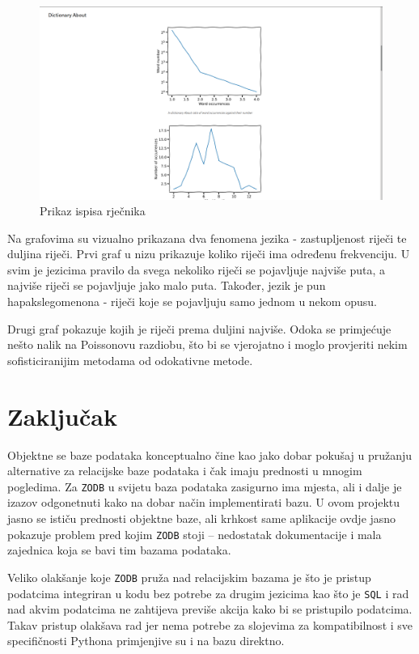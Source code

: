 \documentclass{foi}
\begin{document}
\begin{figure}[!h]
	\includegraphics[width=\textwidth]{slike/solid-spork-stats.png}
	\caption{Prikaz ispisa rječnika}
	\label{ht_stats}
\end{figure}

Na grafovima su vizualno prikazana dva fenomena jezika - zastupljenost riječi
te duljina riječi. Prvi graf u nizu prikazuje koliko riječi ima određenu
frekvenciju. U svim je jezicima pravilo da svega nekoliko riječi se pojavljuje
najviše puta, a najviše riječi se pojavljuje jako malo puta. Također, jezik je
pun hapakslegomenona - riječi koje se pojavljuju samo jednom u nekom opusu.

Drugi graf pokazuje kojih je riječi prema duljini najviše. Odoka se primjećuje
nešto nalik na Poissonovu razdiobu, što bi se vjerojatno i moglo provjeriti
nekim sofisticiranijim metodama od odokativne metode.

\chapter{Zaključak}

Objektne se baze podataka konceptualno čine kao jako dobar pokušaj u pružanju
alternative za relacijske baze podataka i čak imaju prednosti u mnogim
pogledima. Za \texttt{ZODB} u svijetu baza podataka zasigurno ima mjesta, ali i
dalje je izazov odgonetnuti kako na dobar način implementirati bazu. U ovom
projektu jasno se ističu prednosti objektne baze, ali krhkost same aplikacije
ovdje jasno pokazuje problem pred kojim \texttt{ZODB} stoji -- nedostatak
dokumentacije i mala zajednica koja se bavi tim bazama podataka.

Veliko olakšanje koje \texttt{ZODB} pruža nad relacijskim bazama je što je
pristup podatcima integriran u kodu bez potrebe za drugim jezicima kao što je
\texttt{SQL} i rad nad akvim podatcima ne zahtijeva previše akcija kako bi se
pristupilo podatcima. Takav pristup olakšava rad jer nema potrebe za slojevima
za kompatibilnost i sve specifičnosti Pythona primjenjive su i na bazu
direktno.


\pagestyle{plain}

\listoffigures
{}


\end{document}
